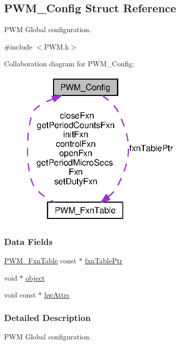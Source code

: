 \subsection{P\+W\+M\+\_\+\+Config Struct Reference}
\label{struct_p_w_m___config}


P\+W\+M Global configuration.  




{\ttfamily \#include $<$P\+W\+M.\+h$>$}



Collaboration diagram for P\+W\+M\+\_\+\+Config\+:
\nopagebreak
\begin{figure}[H]
\begin{center}
\leavevmode
\includegraphics[width=222pt]{struct_p_w_m___config__coll__graph}
\end{center}
\end{figure}
\subsubsection*{Data Fields}
\begin{DoxyCompactItemize}
\item 
\hyperlink{struct_p_w_m___fxn_table}{P\+W\+M\+\_\+\+Fxn\+Table} const $\ast$ \hyperlink{struct_p_w_m___config_ac02604d8e0fafc8b5ff71171a4bf3461}{fxn\+Table\+Ptr}
\item 
void $\ast$ \hyperlink{struct_p_w_m___config_a33c57f0fe6b8af13f7a9c8ec392019a6}{object}
\item 
void const $\ast$ \hyperlink{struct_p_w_m___config_a2299aba19683340f917ca962a9536148}{hw\+Attrs}
\end{DoxyCompactItemize}


\subsubsection{Detailed Description}
P\+W\+M Global configuration. 

